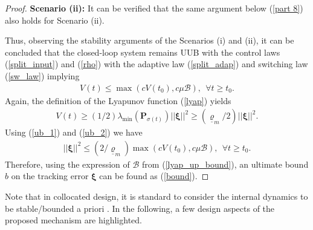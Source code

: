 \documentclass[AMA,STIX1COL,sort, compress]{WileyNJD-v2}
\begin{document}
\begin{proof}
	\textbf{Scenario (ii):} It can be verified that the same argument below (\ref{part 8}) also holds for Scenario (ii). 
	
	Thus, observing the stability arguments of the Scenarios (i) and (ii), it can be concluded that the closed-loop system remains UUB with the control laws (\ref{split_input}) and (\ref{rho}) with the adaptive law (\ref{split_adap}) and switching law (\ref{sw_law}) implying
	\begin{align}
	V(t) \leq \max \left( c V(t_0), c\mu \mathcal{B} \right), ~~\forall t\geq t_0. \label{ub_1}
	\end{align}
	Again, the definition of the Lyapunov function (\ref{lyap}) yields
	\begin{align}
	V(t) \geq ({1}/{2}) \lambda_{\min} (\mathbf P_{\sigma(t)}) || \boldsymbol \xi || ^2 \geq \left({\underline{\varrho}_m }/{2}\right) || \boldsymbol \xi || ^2. \label{ub_2}
	\end{align}
	Using (\ref{ub_1}) and (\ref{ub_2}) we have
	\begin{align}
	|| \boldsymbol \xi || ^2 \leq \left({2}/{\underline{\varrho}_m }\right) \max \left( c V(t_0), c \mu \mathcal{B} \right), ~~\forall t\geq t_0. \label{ub_3}
	\end{align}
	Therefore, using the expression of $\mathcal{B}$ from (\ref{lyap_up_bound}), an ultimate bound $b$ on the tracking error $\boldsymbol \xi$ can be found as (\ref{bound}).
\end{proof}
Note that in collocated design, it is standard to consider the internal dynamics to be stable/bounded a priori \cite{shkolnik2008high,spong1994partial}. In the following, a few design aspects of the proposed mechanism are highlighted. 
\end{document}
